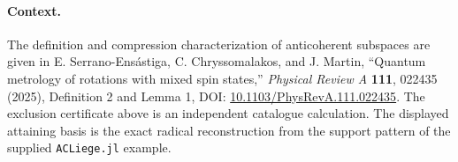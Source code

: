 \documentclass[11pt]{article}
\begin{document}
\paragraph{Context.}
The definition and compression characterization of anticoherent subspaces are given in E. Serrano-Ens\'{a}stiga, C. Chryssomalakos, and J. Martin, ``Quantum metrology of rotations with mixed spin states,'' \emph{Physical Review A} \textbf{111}, 022435 (2025), Definition 2 and Lemma 1, DOI: \href{https://doi.org/10.1103/PhysRevA.111.022435}{10.1103/PhysRevA.111.022435}. The exclusion certificate above is an independent catalogue calculation. The displayed attaining basis is the exact radical reconstruction from the support pattern of the supplied \texttt{ACLiege.jl} example.
\end{document}
